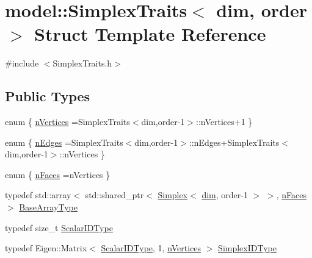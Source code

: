 \hypertarget{structmodel_1_1_simplex_traits}{}\section{model\+:\+:Simplex\+Traits$<$ dim, order $>$ Struct Template Reference}
\label{structmodel_1_1_simplex_traits}


{\ttfamily \#include $<$Simplex\+Traits.\+h$>$}

\subsection*{Public Types}
\begin{DoxyCompactItemize}
\item 
enum \{ \hyperlink{structmodel_1_1_simplex_traits_adeb0679d9699101e030e5d94844fab73a4e2dd425af75e4abeaa495c82bf5456b}{n\+Vertices} =Simplex\+Traits$<$dim,order-\/1$>$\+:\+:n\+Vertices+1
 \}
\item 
enum \{ \hyperlink{structmodel_1_1_simplex_traits_a05512c4debd6223f44111cbfb0956ffda7eb369326a8fa17f33eea1abd374caa7}{n\+Edges} =Simplex\+Traits$<$dim,order-\/1$>$\+:\+:n\+Edges+\+Simplex\+Traits$<$dim,order-\/1$>$\+:\+:n\+Vertices
 \}
\item 
enum \{ \hyperlink{structmodel_1_1_simplex_traits_a0541ec22e17956e27bc75269ef60572aa19cf4b3aa42d86206e9999725cb5b1ee}{n\+Faces} =n\+Vertices
 \}
\item 
typedef std\+::array$<$ std\+::shared\+\_\+ptr$<$ \hyperlink{classmodel_1_1_simplex}{Simplex}$<$ \hyperlink{plot_nd_a_8m_a382f3ca768b275b8d563604f7fc7df73}{dim}, order-\/1 $>$ $>$, \hyperlink{structmodel_1_1_simplex_traits_a0541ec22e17956e27bc75269ef60572aa19cf4b3aa42d86206e9999725cb5b1ee}{n\+Faces} $>$ \hyperlink{structmodel_1_1_simplex_traits_a57cfde9abd77073f1512baf404bbb328}{Base\+Array\+Type}
\item 
typedef size\+\_\+t \hyperlink{structmodel_1_1_simplex_traits_ab229f3d4d4f2bf8205fa73777b4412a9}{Scalar\+I\+D\+Type}
\item 
typedef Eigen\+::\+Matrix$<$ \hyperlink{structmodel_1_1_simplex_traits_ab229f3d4d4f2bf8205fa73777b4412a9}{Scalar\+I\+D\+Type}, 1, \hyperlink{structmodel_1_1_simplex_traits_adeb0679d9699101e030e5d94844fab73a4e2dd425af75e4abeaa495c82bf5456b}{n\+Vertices} $>$ \hyperlink{structmodel_1_1_simplex_traits_aea38aba3da1babde2d5f0c62f7862eae}{Simplex\+I\+D\+Type}
\end{DoxyCompactItemize}
